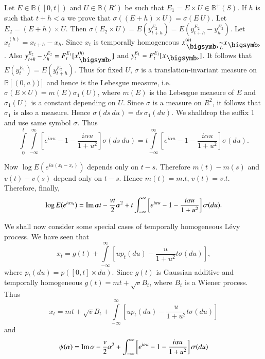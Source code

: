 Let $E \in \mathbb{B}( [0,t])$ and $U \in \mathbb{B}(R')$ be such that
$E_1 = E \times U \in  \mathbb{B}^+ (S)$. If $h$ is such that $t +  h
< a$ we prove that $\sigma((E+h) \times U) = \sigma (E \ U)$. Let $E_2
= (E+h) \times U$. Then $\sigma (E_2\times U) =  E(y^{E_2}_{t+h}) =
E(y^{E_2}_{t+h}-y^{E_{2}}_{h})$. Let $x^{(h)}_t = x_{t+h} - x_h$. Since $x_t$ is
temporally homogeneous $x^{(h)}_{\bigdot}
\undersim{L}x_{\bigdot}$. Also $y^{E_2}_{t+h}-
y^{E_2}_{h}=F^{E_1}_{t}[x^{(h)}_{\bigdot}]$ and $y^{E_1}_t = F^{E_1}_t
[x_{\bigdot}]$. It
follows that $E(y^{E_1}_{t})= E(y^{E_2}_{t+h})$. Thus  for fixed
$U$, $\sigma$ is a translation-invariant measure on $\mathbb{B} [
  (0,a))]$ and hence is the Lebesgue measure, i.e. $\sigma (E \times
U) = m  (E) \sigma_1 (U)$, where $m(E)$ is the Lebesgue  measure of
$E$ and $\sigma_1(U)$ is a constant depending on $U$. Since $\sigma$
is a measure on $R^2$, it follows that $\sigma_1$ is also a
measure. Hence $\sigma (ds\ du)= ds\, \sigma_1 (du)$. We
shall\pageoriginale drop the suffix 1 and use same symbol $\sigma$. Thus  
$$ 
\int\limits^{t}_0 \int\limits^{\infty}_{- \infty} \left[ e^{i \alpha
    u}-1- \frac{i \alpha u}{1 + u^2}\right] \sigma (ds\ du) = t
\int\limits^{\infty}_{- \infty} \left[e^{i\alpha u}-1- \frac{i \alpha
    u}{1 + u^2}\right] \sigma (du).  
$$

Now $\log E(e^{i \alpha (x_t - x_s)})$ depends only  on
$t-s$. Therefore $m(t) - m(s)$ and $v(t) - v(s)$ depend only  on
$t-s$. Hence $m(t)= m.t$, $v(t) = v.t$. Therefore, finally, 
$$
\log E(e^{i \alpha x_t}) = \operatorname{Im} \alpha t -  \frac{vt}{2} \alpha^2 +  t 
\int_{- \infty}^\infty \left[ e^{i \alpha u}-1- \frac{i \alpha u}{1 + u^2}\right]
\sigma (du). 
$$

We shall now consider some special cases of temporally homogeneous
L\'evy process. We have  seen that  
$$
x_t = g(t) + \int\limits_{-\infty}^\infty \left[ u p_t (du) - \frac{u}{1+
    u^2} t \sigma (du)\right],
$$
where $p_t (du) = p( [0,t] \times du)$. Since $g(t)$ is Gaussian
additive and temporally homogeneous $g(t) = mt +  \sqrt{v} B_t$, where
$B_t$ is a Wiener process. Thus 
$$
x_t = mt  + \sqrt{v} B_t + \int\limits_{- \infty}^\infty \left[u p_t (du) -
  \frac{u}{1 + u^2} t \sigma (du)\right]
$$
and
$$
\psi ( \alpha) = \operatorname{Im} \alpha - \frac{v}{2} \alpha^2 +  \int_{-
    \infty}^\infty \left[e^{i \alpha u }- 1- \frac{i \alpha u}{1+
      u^2}\right] \sigma (du)
$$

